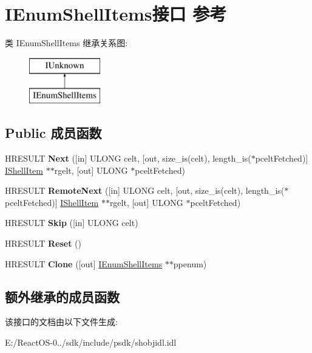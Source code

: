 \hypertarget{interface_i_enum_shell_items}{}\section{I\+Enum\+Shell\+Items接口 参考}
\label{interface_i_enum_shell_items}
类 I\+Enum\+Shell\+Items 继承关系图\+:\begin{figure}[H]
\begin{center}
\leavevmode
\includegraphics[height=2.000000cm]{interface_i_enum_shell_items}
\end{center}
\end{figure}
\subsection*{Public 成员函数}
\begin{DoxyCompactItemize}
\item 
\mbox{\label{interface_i_enum_shell_items_af770a01f3628621b9a03d42379e641ed}} 
H\+R\+E\+S\+U\+LT {\bfseries Next} (\mbox{[}in\mbox{]} U\+L\+O\+NG celt, \mbox{[}out, size\+\_\+is(celt), length\+\_\+is($\ast$pcelt\+Fetched)\mbox{]} \hyperlink{interface_i_shell_item}{I\+Shell\+Item} $\ast$$\ast$rgelt, \mbox{[}out\mbox{]} U\+L\+O\+NG $\ast$pcelt\+Fetched)
\item 
\mbox{\label{interface_i_enum_shell_items_afe4595b6d582f343218616d14cd6f814}} 
H\+R\+E\+S\+U\+LT {\bfseries Remote\+Next} (\mbox{[}in\mbox{]} U\+L\+O\+NG celt, \mbox{[}out, size\+\_\+is(celt), length\+\_\+is($\ast$pcelt\+Fetched)\mbox{]} \hyperlink{interface_i_shell_item}{I\+Shell\+Item} $\ast$$\ast$rgelt, \mbox{[}out\mbox{]} U\+L\+O\+NG $\ast$pcelt\+Fetched)
\item 
\mbox{\label{interface_i_enum_shell_items_a05932145d71b316abf9781206963c325}} 
H\+R\+E\+S\+U\+LT {\bfseries Skip} (\mbox{[}in\mbox{]} U\+L\+O\+NG celt)
\item 
\mbox{\label{interface_i_enum_shell_items_ab8495a008f3953ff858c0eb78949080e}} 
H\+R\+E\+S\+U\+LT {\bfseries Reset} ()
\item 
\mbox{\label{interface_i_enum_shell_items_a16adad6bcde778e2ce37218f0232e404}} 
H\+R\+E\+S\+U\+LT {\bfseries Clone} (\mbox{[}out\mbox{]} \hyperlink{interface_i_enum_shell_items}{I\+Enum\+Shell\+Items} $\ast$$\ast$ppenum)
\end{DoxyCompactItemize}
\subsection*{额外继承的成员函数}


该接口的文档由以下文件生成\+:\begin{DoxyCompactItemize}
\item 
E\+:/\+React\+O\+S-\/0../sdk/include/psdk/shobjidl.\+idl\end{DoxyCompactItemize}
